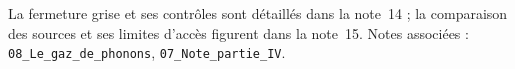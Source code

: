 \documentclass[11pt,a4paper]{article}
\begin{document}
\vspace{4pt}
\noindent\small
La fermeture grise et ses contrôles sont détaillés dans la note~14 ; la comparaison des sources et ses limites d'accès figurent dans la note~15. Notes associées : \texttt{08\_\allowbreak Le\_\allowbreak gaz\_\allowbreak de\_\allowbreak phonons},
\texttt{07\_\allowbreak Note\_\allowbreak partie\_\allowbreak IV}.
\end{document}
